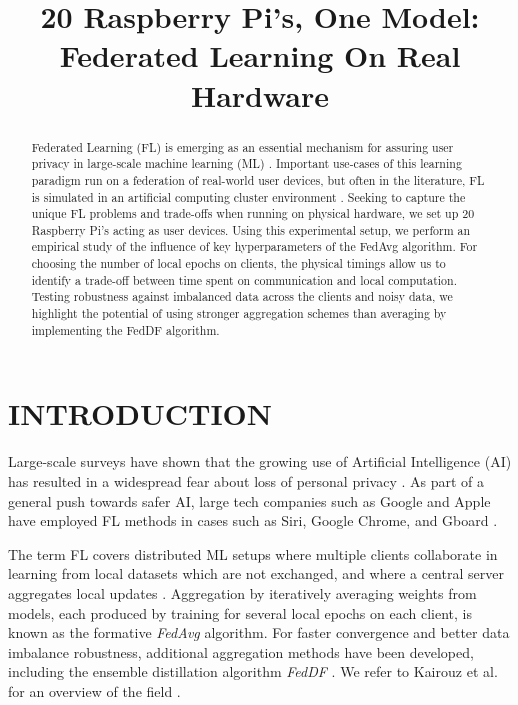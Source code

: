 \documentclass{article}
\title{20 Raspberry Pi's, One Model: Federated Learning On Real Hardware}
\begin{document}
%

\maketitle
%
\begin{abstract}
    Federated Learning (FL) is emerging as an essential mechanism for assuring user privacy in large-scale machine learning (ML) \cite{kai2021advances}.
    Important use-cases of this learning paradigm run on a federation of real-world user devices, but often in the literature, FL is simulated in an artificial computing cluster environment \cite{kai2021advances,mcmahan2017communication,lin2020ensemble}.
    Seeking to capture the unique FL problems and trade-offs when running on physical hardware, we set up 20 Raspberry Pi's acting as user devices.
    Using this experimental setup, we perform an empirical study of the influence of key hyperparameters of the FedAvg \cite{mcmahan2017communication} algorithm.
    For choosing the number of local epochs on clients, the physical timings allow us to identify a trade-off between time spent on communication and local computation.
    Testing robustness against imbalanced data across the clients and noisy data, we highlight the potential of using stronger aggregation schemes than averaging by implementing the FedDF \cite{lin2020ensemble} algorithm.
\end{abstract}

\section{INTRODUCTION}
\label{sec:intro}
Large-scale surveys have shown that the growing use of Artificial Intelligence (AI) has resulted in a widespread fear about loss of personal privacy \cite{beuc2020consumers, west2018survey}.
As part of a general push towards safer AI, large tech companies such as Google and Apple have employed FL methods in cases such as Siri, Google Chrome, and Gboard \cite{kai2021advances}.

The term FL covers distributed ML setups where multiple clients collaborate in learning from local datasets which are not exchanged, and where a central server aggregates local updates \cite{kai2021advances, mcmahan2017communication}.
Aggregation by iteratively averaging weights from models, each produced by training for several local epochs on each client, is known as the formative \emph{FedAvg} \cite{mcmahan2017communication} algorithm.
For faster convergence and better data imbalance robustness, additional aggregation methods have been developed, including the ensemble distillation algorithm \emph{FedDF} \cite{lin2020ensemble}. We refer to Kairouz et al. for an overview of the field \cite{kai2021advances}.
\end{document}
